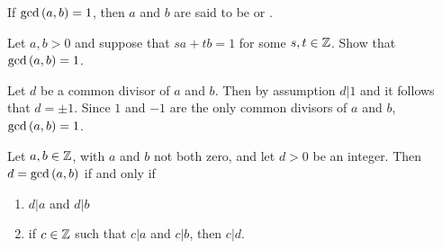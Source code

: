 \documentclass[11pt,fleqn,dvipsnames,usenames]{article}
\begin{document}
 If $\text{gcd}\left(a,b\right) = 1$, then $a$ and $b$ are said to be   or .
\vsp

\begin{example}
Let $a,b > 0$ and suppose that $sa + tb = 1$ for some $s,t\in\mathbb{Z}$.  Show that $\text{gcd}\left(a,b\right) = 1$.
\end{example}

\solution Let $d$ be a common divisor of $a$ and $b$.  Then by assumption $d|1$ and it follows that $d = \pm 1$.  Since $1$ and $-1$ are the only common divisors of $a$ and $b$, $\text{gcd}\left(a,b\right) = 1$.
\vsp

\begin{corollary}\label{gcdaltdef}
Let $a,b\in\mathbb{Z}$, with $a$ and $b$ not both zero, and let $d>0$ be an integer.  Then $d = \text{gcd}\left(a,b\right)$ if and only if
\begin{enumerate}[(1)]
\item $d|a$ and $d|b$
\item if $c\in\mathbb{Z}$ such that $c|a$ and $c|b$, then $c|d$.
\end{enumerate}
\end{corollary}
\end{document}
